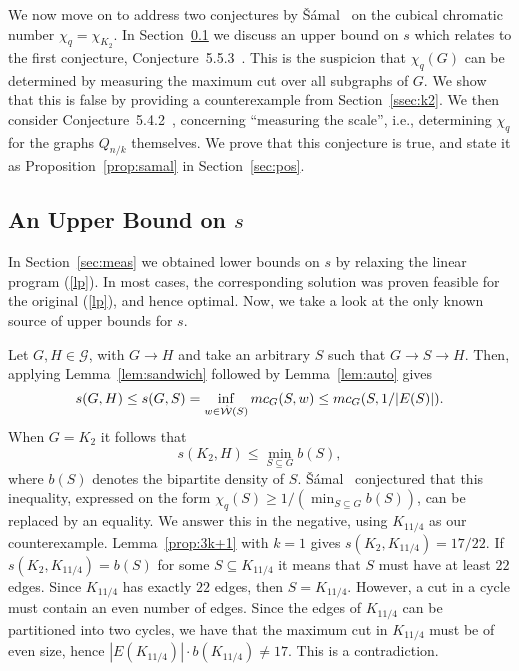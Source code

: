 \documentclass[11pt,a4paper]{article}
\begin{document}
We now move on to address two conjectures by \v{S}\'{a}mal~\cite{samal:06} on the cubical
chromatic number $\chi_q = \chi_{K_2}$.
In Section~\ref{sec:neg} we discuss an upper bound on $s$ which relates to
the first conjecture, Conjecture~5.5.3~\cite{samal:06}.
This is the suspicion
that $\chi_q(G)$ can be determined by measuring the maximum cut over
all subgraphs of $G$.
We show that this is false by providing a counterexample from
Section~\ref{ssec:k2}.
We then consider Conjecture~5.4.2~\cite{samal:06}, 
concerning ``measuring the scale'', i.e.,
determining $\chi_q$ for the graphs $Q_{n/k}$ themselves.
We prove that this conjecture is true, 
and state it as Proposition~\ref{prop:samal} in Section~\ref{sec:pos}.


\subsection{An Upper Bound on $s$} \label{sec:neg}

In Section~\ref{sec:meas} we obtained lower bounds on $s$ by relaxing the
linear program (\ref{lp}).
In most cases, the corresponding solution was proven feasible for the
original (\ref{lp}), and hence optimal.
Now, we take a look at the only known source of upper bounds for $s$.

Let $G, H \in \mathcal{G}$, with $G \rightarrow H$ and take an arbitrary
$S$ such that $G \rightarrow S \rightarrow H$.
Then, applying Lemma~\ref{lem:sandwich} followed by Lemma~\ref{lem:auto}
gives
\begin{equation} \label{eq:ub}
  s(G,H) \leq s(G,S) = \inf_{w \in {\cal {\hat W}}(S)} mc_G(S,w) 
  \leq mc_{G}(S, 1/|E(S)|).
\end{equation}
When $G = K_2$ it follows that
\begin{equation} \label{eq:samub}
  s(K_2,H) \leq \min_{S \subseteq G} b(S),
\end{equation}
where $b(S)$ denotes the bipartite density of $S$.
\v{S}\'{a}mal~\cite{samal:06} conjectured that
this inequality, expressed on the form
$\chi_q(S) \geq 1/(\min_{S \subseteq G} b(S))$,
can be replaced by an equality.
We answer this in the negative, using $K_{11/4}$ as our counterexample.
Lemma~\ref{prop:3k+1} with $k = 1$ gives $s(K_2,K_{11/4}) = 17/22$.
If $s(K_2,K_{11/4}) = b(S)$ for some $S \subseteq K_{11/4}$ it means
that $S$ must have at least $22$ edges. 
Since $K_{11/4}$ has exactly $22$ edges, then $S = K_{11/4}$.
However, a cut in a cycle must contain an even number of edges.
Since the edges of $K_{11/4}$ can be partitioned into two cycles,
we have that the maximum cut in $K_{11/4}$ must be of even size,
hence $|E(K_{11/4})| \cdot b(K_{11/4}) \neq 17$.
This is a contradiction.
\end{document}
